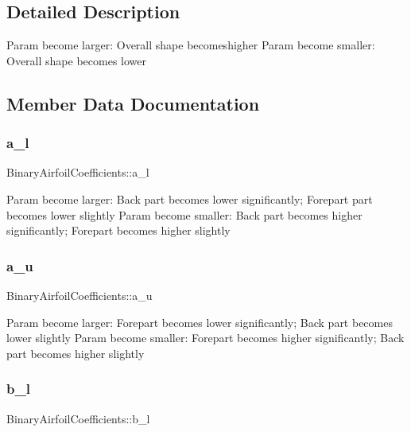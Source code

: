 \subsection{Detailed Description}
Param become larger\+: Overall shape becomeshigher Param become smaller\+: Overall shape becomes lower 

\subsection{Member Data Documentation}
\mbox{\label{struct_binary_airfoil_coefficients_a49511b7e8398b06d8d880c7576ab5311}} 
\subsubsection{\texorpdfstring{a\+\_\+l}{a\_l}}
{\footnotesize\ttfamily Binary\+Airfoil\+Coefficients\+::a\+\_\+l}

Param become larger\+: Back part becomes lower significantly; Forepart part becomes lower slightly Param become smaller\+: Back part becomes higher significantly; Forepart becomes higher slightly \mbox{\label{struct_binary_airfoil_coefficients_a2fd01b5ce7c9bef55ba5e30bd19c062a}} 
\subsubsection{\texorpdfstring{a\+\_\+u}{a\_u}}
{\footnotesize\ttfamily Binary\+Airfoil\+Coefficients\+::a\+\_\+u}

Param become larger\+: Forepart becomes lower significantly; Back part becomes lower slightly Param become smaller\+: Forepart becomes higher significantly; Back part becomes higher slightly \mbox{\label{struct_binary_airfoil_coefficients_a3d553603f76f7b5ddc6febc3a70db3f3}} 
\subsubsection{\texorpdfstring{b\+\_\+l}{b\_l}}
{\footnotesize\ttfamily Binary\+Airfoil\+Coefficients\+::b\+\_\+l}

